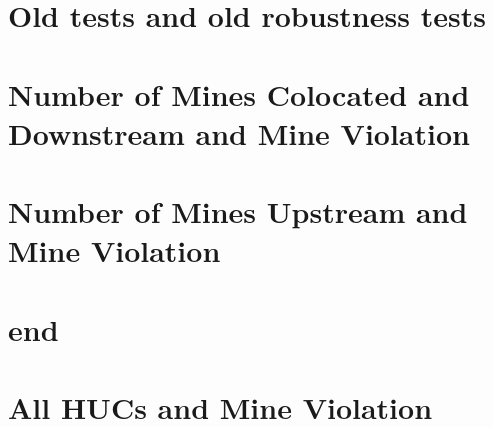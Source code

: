 \documentclass{beamer}
\begin{document}
\section{Old tests and old robustness tests}

\begin{frame}{}

\end{frame}

\begin{frame}{}

\end{frame}

\section{Number of Mines Colocated and Downstream and Mine Violation}

\begin{frame}{}

\end{frame}

\begin{frame}{}

\end{frame}

\section{Number of Mines Upstream and Mine Violation}

\begin{frame}{}

\end{frame}


\begin{frame}{}

\end{frame}

\section{end}

\section{All HUCs and Mine Violation}

\begin{frame}{}

\end{frame}
\end{document}
